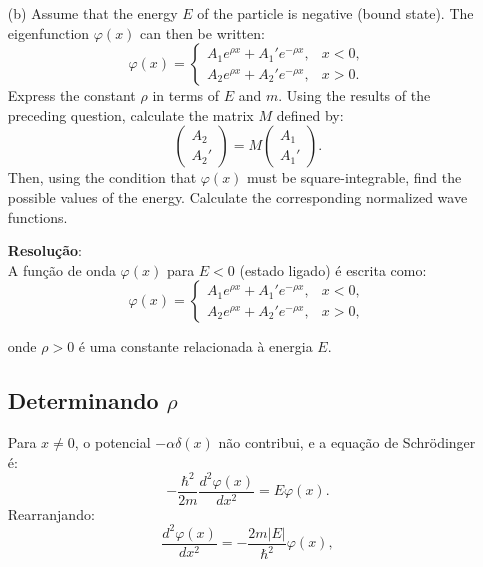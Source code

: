 \documentclass[a4paper,12pt]{article}
\begin{document}
\begin{enumerate}
    \item[(b)] Assume that the energy \( E \) of the particle is negative (bound state). The eigenfunction \( \varphi(x) \) can then be written:
    \[
    \varphi(x) =
    \begin{cases}
        A_1 e^{\rho x} + A_1' e^{-\rho x}, & x < 0, \\
        A_2 e^{\rho x} + A_2' e^{-\rho x}, & x > 0.
    \end{cases}
    \]
    Express the constant \( \rho \) in terms of \( E \) and \( m \). Using the results of the preceding question, calculate the matrix \( M \) defined by:
    \[
    \begin{pmatrix}
    A_2 \\ A_2'
    \end{pmatrix}
    = M
    \begin{pmatrix}
    A_1 \\ A_1'
    \end{pmatrix}.
    \]
    Then, using the condition that \( \varphi(x) \) must be square-integrable, find the possible values of the energy. Calculate the corresponding normalized wave functions.

    \textbf{Resolu\c{c}\~ao}:\\

    A função de onda \( \varphi(x) \) para \( E < 0 \) (estado ligado) é escrita como:
\begin{equation}
\varphi(x) =
\begin{cases}
A_1 e^{\rho x} + A_1' e^{-\rho x}, & x < 0, \\
A_2 e^{\rho x} + A_2' e^{-\rho x}, & x > 0,
\end{cases}
\end{equation}

onde \( \rho > 0 \) é uma constante relacionada à energia \( E \).

\subsection*{Determinando \( \rho \)}
Para \( x \neq 0 \), o potencial \( -\alpha \delta(x) \) não contribui, e a equação de Schrödinger é:
\begin{equation}
-\frac{\hbar^2}{2m} \frac{d^2 \varphi(x)}{dx^2} = E \varphi(x).
\end{equation}
Rearranjando:
\begin{equation}
\frac{d^2 \varphi(x)}{dx^2} = -\frac{2m|E|}{\hbar^2} \varphi(x),
\end{equation}


\end{enumerate}
\end{document}
